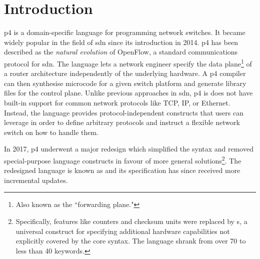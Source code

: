 \chapter*{Introduction}

\begin{chapterabstract}
\end{chapterabstract}

\acrfull{p4} is a domain-specific language for programming network switches. It
became widely popular in the field of \acrfull{sdn} since its introduction in
2014\cite{p4original}. \acrshort{p4} has been described as the \emph{natural
evolution} of OpenFlow, a standard communications protocol for \acrshort{sdn}.
The language lets a network engineer specify the data plane\footnote{Also known
as the ``forwarding plane."} of a router architecture independently of the
underlying hardware. A \acrshort{p4} compiler can then synthesise microcode for
a given switch platform and generate library files
for the control plane. Unlike previous approaches in \acrshort{sdn},
\acrshort{p4} is does not have built-in support for common network protocols
like TCP, IP, or Ethernet. Instead, the language provides protocol-independent
constructs that users can leverage in order to define arbitrary protocols and
instruct a flexible network switch on how to handle them.

In 2017, \acrshort{p4} underwent a major redesign\cite{p416} which simplified
the syntax and removed special-purpose language constructs in favour of more
general solutions\footnote{Specifically, features like counters and checksum
units were replaced by \extern{}s, a universal construct for specifying
additional hardware capabilities not explicitly covered by the core syntax. The
language shrank from over 70 to less than 40
keywords\cite{p416:v1:spec:comparison}.}. The redesigned language is known as
\pfs\cite{p416:v123:spec} and its specification has since received more
incremental updates.


